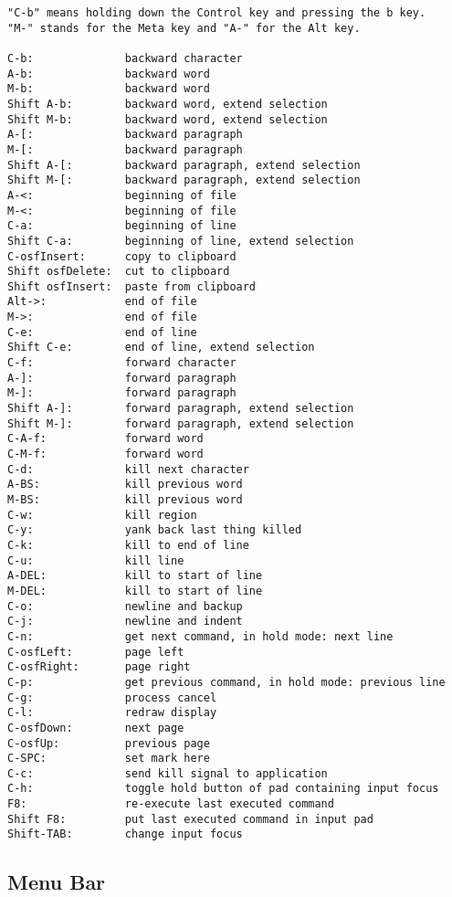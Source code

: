 \begin{verbatim}
"C-b" means holding down the Control key and pressing the b key.
"M-" stands for the Meta key and "A-" for the Alt key.

C-b:              backward character
A-b:              backward word
M-b:              backward word
Shift A-b:        backward word, extend selection
Shift M-b:        backward word, extend selection
A-[:              backward paragraph
M-[:              backward paragraph
Shift A-[:        backward paragraph, extend selection
Shift M-[:        backward paragraph, extend selection
A-<:              beginning of file
M-<:              beginning of file
C-a:              beginning of line
Shift C-a:        beginning of line, extend selection
C-osfInsert:      copy to clipboard
Shift osfDelete:  cut to clipboard
Shift osfInsert:  paste from clipboard
Alt->:            end of file
M->:              end of file
C-e:              end of line
Shift C-e:        end of line, extend selection
C-f:              forward character
A-]:              forward paragraph
M-]:              forward paragraph
Shift A-]:        forward paragraph, extend selection
Shift M-]:        forward paragraph, extend selection
C-A-f:            forward word
C-M-f:            forward word
C-d:              kill next character
A-BS:             kill previous word
M-BS:             kill previous word
C-w:              kill region
C-y:              yank back last thing killed
C-k:              kill to end of line
C-u:              kill line
A-DEL:            kill to start of line
M-DEL:            kill to start of line
C-o:              newline and backup
C-j:              newline and indent
C-n:              get next command, in hold mode: next line
C-osfLeft:        page left
C-osfRight:       page right
C-p:              get previous command, in hold mode: previous line
C-g:              process cancel
C-l:              redraw display
C-osfDown:        next page
C-osfUp:          previous page
C-SPC:            set mark here
C-c:              send kill signal to application
C-h:              toggle hold button of pad containing input focus
F8:               re-execute last executed command
Shift F8:         put last executed command in input pad
Shift-TAB:        change input focus
\end{verbatim}

\subsection{Menu Bar}

